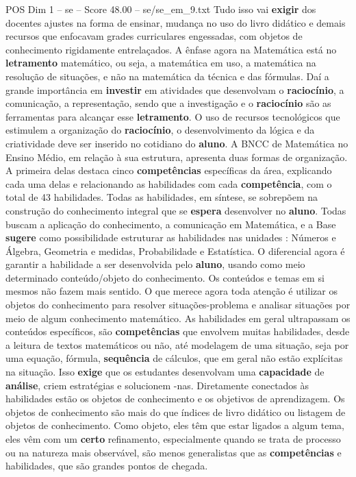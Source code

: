 \begin{textsample}{POS Dim 1 – se – Score 48.00 – se/se\_em\_9.txt}
Tudo isso vai \textbf{exigir} dos docentes ajustes na forma de ensinar, mudança no uso do livro didático e demais recursos que enfocavam grades curriculares engessadas, com objetos de conhecimento rigidamente entrelaçados.
A ênfase agora na Matemática está no \textbf{letramento} matemático, ou seja, a matemática em uso, a matemática na resolução de situações, e não na matemática da técnica e das fórmulas.
Daí a grande importância em \textbf{investir} em atividades que desenvolvam o \textbf{raciocínio}, a comunicação, a representação, sendo que a investigação e o \textbf{raciocínio} são as ferramentas para alcançar esse \textbf{letramento}.
O uso de recursos tecnológicos que estimulem a organização do \textbf{raciocínio}, o desenvolvimento da lógica e da criatividade deve ser inserido no cotidiano do \textbf{aluno}.
A BNCC de Matemática no Ensino Médio, em relação à sua estrutura, apresenta duas formas de organização.
A primeira delas destaca cinco \textbf{competências} específicas da área, explicando cada uma delas e relacionando as habilidades com cada \textbf{competência}, com o total de 43 habilidades.
Todas as habilidades, em síntese, se sobrepõem na construção do conhecimento integral que se \textbf{espera} desenvolver no \textbf{aluno}.
Todas buscam a aplicação do conhecimento, a comunicação em Matemática, e a Base \textbf{sugere} como possibilidade estruturar as habilidades nas unidades : Números e Álgebra, Geometria e medidas, Probabilidade e Estatística.
O diferencial agora é garantir a habilidade a ser desenvolvida pelo \textbf{aluno}, usando como meio determinado conteúdo/objeto do conhecimento.
Os conteúdos e temas em si mesmos não fazem mais sentido.
O que merece agora toda atenção é utilizar os objetos do conhecimento para resolver situações-problema e analisar situações por meio de algum conhecimento matemático.
As habilidades em geral ultrapassam os conteúdos específicos, são \textbf{competências} que envolvem muitas habilidades, desde a leitura de textos matemáticos ou não, até modelagem de uma situação, seja por uma equação, fórmula, \textbf{sequência} de cálculos, que em geral não estão explícitas na situação.
Isso \textbf{exige} que os estudantes desenvolvam uma \textbf{capacidade} de \textbf{análise}, criem estratégias e solucionem -nas.
Diretamente conectados às habilidades estão os objetos de conhecimento e os objetivos de aprendizagem.
Os objetos de conhecimento são mais do que índices de livro didático ou listagem de objetos de conhecimento.
Como objeto, eles têm que estar ligados a algum tema, eles vêm com um \textbf{certo} refinamento, especialmente quando se trata de processo ou na natureza mais observável, são menos generalistas que as \textbf{competências} e habilidades, que são grandes pontos de chegada.

\end{textsample}
